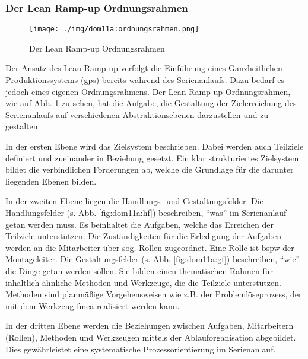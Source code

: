 \subsubsection{Der Lean Ramp-up Ordnungsrahmen}\label{sec:dom11a:ordnungsrahmen}
\begin{figure}[h]
 \centering
 \texttt{[image: ./img/dom11a:ordnungsrahmen.png]}
 \caption[Der Lean Ramp-up Ordnungsrahmen]{Der Lean Ramp-up Ordnungsrahmen \cite{Dombrowski2011a}}
 \label{fig:dom11a:ordnungsrahmen}
\end{figure}

Der Ansatz des Lean Ramp-up verfolgt die Einführung eines Ganzheitlichen Produktionssystems (\gls{gps}) bereits während des Serienanlaufs. Dazu bedarf es jedoch eines eigenen Ordnungsrahmens. Der Lean Ramp-up Ordnungsrahmen, wie auf Abb. \ref{fig:dom11a:ordnungsrahmen} zu sehen, hat die Aufgabe, die Gestaltung der Zielerreichung des Serienanlaufs auf verschiedenen Abstraktionsebenen darzustellen und zu gestalten. 

In der ersten Ebene wird das Zielsystem beschrieben. Dabei werden auch Teilziele definiert und zueinander in Beziehung gesetzt. Ein klar strukturiertes Zielsystem bildet die verbindlichen Forderungen ab, welche die Grundlage für die darunter liegenden Ebenen bilden. 

In der zweiten Ebene liegen die Handlungs- und Gestaltungsfelder. Die Handlungsfelder (s. Abb. \ref{fig:dom11a:hf}) beschreiben, ``was'' im Serienanlauf getan werden muss. Es beinhaltet die Aufgaben, welche das Erreichen der Teilziele unterstützen. Die Zuständigkeiten für die Erledigung der Aufgaben werden an die Mitarbeiter über sog. Rollen zugeordnet. Eine Rolle ist \gls{bspw} der Montageleiter. 
Die Gestaltungsfelder (s. Abb. \ref{fig:dom11a:gf}) beschreiben, ``wie'' die Dinge getan werden sollen. Sie bilden einen thematischen Rahmen für inhaltlich ähnliche Methoden und Werkzeuge, die die Teilziele unterstützen. Methoden sind planmäßige Vorgehensweisen wie z.B. der Problemlöseprozess, der mit dem Werkzeug \gls{fmea}
realisiert werden kann.  

In der dritten Ebene werden die Beziehungen zwischen Aufgaben, Mitarbeitern (Rollen), Methoden und Werkzeugen mittels der Ablauforganisation abgebildet. Dies gewährleistet eine systematische Prozessorientierung im Serienanlauf. 

